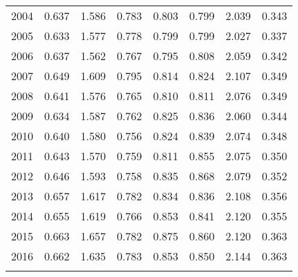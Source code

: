 \begin{table}[!htbp]
\begin{tabular}{@{\extracolsep{5pt}} cccccccc}
2004 & 0.637 & 1.586 & 0.783 & 0.803 & 0.799 & 2.039 & 0.343 \\ 
2005 & 0.633 & 1.577 & 0.778 & 0.799 & 0.799 & 2.027 & 0.337 \\ 
2006 & 0.637 & 1.562 & 0.767 & 0.795 & 0.808 & 2.059 & 0.342 \\ 
2007 & 0.649 & 1.609 & 0.795 & 0.814 & 0.824 & 2.107 & 0.349 \\ 
2008 & 0.641 & 1.576 & 0.765 & 0.810 & 0.811 & 2.076 & 0.349 \\ 
2009 & 0.634 & 1.587 & 0.762 & 0.825 & 0.836 & 2.060 & 0.344 \\ 
2010 & 0.640 & 1.580 & 0.756 & 0.824 & 0.839 & 2.074 & 0.348 \\ 
2011 & 0.643 & 1.570 & 0.759 & 0.811 & 0.855 & 2.075 & 0.350 \\ 
2012 & 0.646 & 1.593 & 0.758 & 0.835 & 0.868 & 2.079 & 0.352 \\ 
2013 & 0.657 & 1.617 & 0.782 & 0.834 & 0.836 & 2.108 & 0.356 \\ 
2014 & 0.655 & 1.619 & 0.766 & 0.853 & 0.841 & 2.120 & 0.355 \\ 
2015 & 0.663 & 1.657 & 0.782 & 0.875 & 0.860 & 2.120 & 0.363 \\ 
2016 & 0.662 & 1.635 & 0.783 & 0.853 & 0.850 & 2.144 & 0.363 \\ 
\hline \\[-1.8ex] 
\end{tabular} 
\end{table} 
